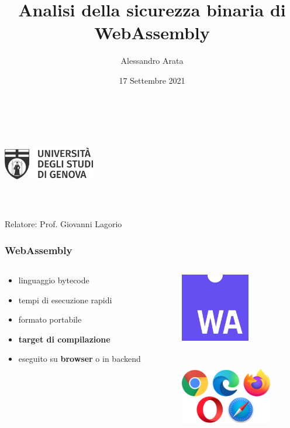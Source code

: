 \documentclass{beamer}
\begin{document}
\title[Sicurezza binaria di WebAssembly]{Analisi della sicurezza binaria di WebAssembly}
\author{Alessandro Arata}
\date{17 Settembre 2021}
\begin{frame}
\centerline{\includegraphics[width=4cm,height=4cm,keepaspectratio]{images/unige.png}}
  \titlepage
  \centerline{Relatore: Prof. Giovanni Lagorio}
\end{frame}

\begin{frame}
  \frametitle{WebAssembly}
  \begin{columns}
    \begin{column}{0.6\textwidth}
      \begin{itemize}
        \item linguaggio bytecode 
        \item tempi di esecuzione rapidi
        \item formato portabile
      \pause
      \item \textbf{target di compilazione}
      \pause
      \item eseguito su \textbf{browser} o in backend 
      \end{itemize}
    \end{column}
    \begin{column}{0.4\textwidth}
      \centerline{\includegraphics[width=3cm,height=3cm,keepaspectratio]{images/logo.png}}
      \newline\newline\newline
      \centerline{\includegraphics[width=4cm,height=4cm,keepaspectratio]{images/browser-logos.png}}
    \end{column}
  \end{columns}
\end{frame}
\end{document}
